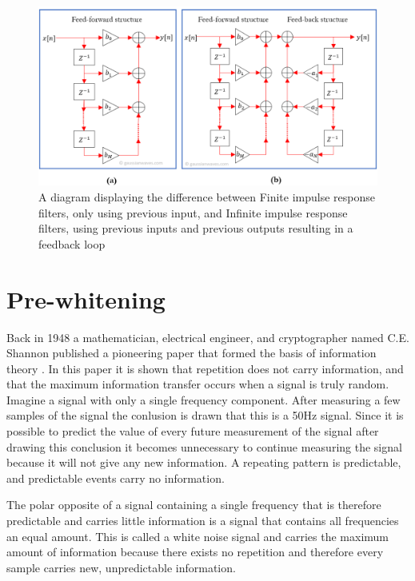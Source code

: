 \begin{figure}[h!t]
	\begin{center}
		\includegraphics[width=1.0\columnwidth]{images/fir_vs_iir_diagram.png}
	\end{center}
	\caption{A diagram displaying the difference between Finite impulse response filters, only using previous input, and Infinite impulse response filters, using previous inputs and previous outputs resulting in a feedback loop \cite{fir_vs_iir_diagram}}
	\label{fig:fir_vs_iir_diagram}
\end{figure}


\section{Pre-whitening}
Back in 1948 a mathematician, electrical engineer, and cryptographer named C.E. Shannon published a pioneering paper that formed the basis of information theory \cite{shannon}. In this paper it is shown that repetition does not carry information, and that the maximum information transfer occurs when a signal is truly random. Imagine a signal with only a single frequency component. After measuring a few samples of the signal the conlusion is drawn that this is a 50Hz signal. Since it is possible to predict the value of every future measurement of the signal after drawing this conclusion it becomes unnecessary to continue measuring the signal because it will not give any new information. A repeating pattern is predictable, and predictable events carry no information.

The polar opposite of a signal containing a single frequency that is therefore predictable and carries little information is a signal that contains all frequencies an equal amount. This is called a white noise signal and carries the maximum amount of information because there exists no repetition and therefore every sample carries new, unpredictable information.

